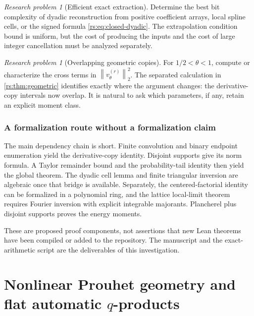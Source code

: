 \documentclass[11pt,a4paper,oneside,openany]{book}
\numberwithin{equation}{chapter}
\theoremstyle{definition}
\theoremstyle{remark}
\newtheorem{problem}[theorem]{Research problem}
\newcommand{\norm}[1]{\left\lVert #1\right\rVert}
\begin{document}
\begin{problem}[Efficient exact extraction]
Determine the best bit complexity of dyadic reconstruction from
positive coefficient arrays, local spline cells, or the signed
formula \eqref{rs:eq:closed-dyadic}. The extrapolation condition bound
is uniform, but the cost of producing the inputs and the cost of
large integer cancellation must be analyzed separately.
\end{problem}

\begin{problem}[Overlapping geometric copies]
For $1/2<\theta<1$, compute or characterize the cross terms in
$\norm{v_\theta^{(r)}}_2^2$. The separated calculation in
\cref{rs:thm:geometric} identifies exactly where the argument changes:
the derivative-copy intervals now overlap. It is natural to ask
which parameters, if any, retain an explicit moment class.
\end{problem}

\section{A formalization route without a formalization claim}

The main dependency chain is short. Finite convolution and binary
endpoint enumeration yield the derivative-copy identity. Disjoint
supports give its norm formula. A Taylor remainder bound and the
probability-tail identity then yield the global theorem. The
dyadic cell lemma and finite triangular inversion are algebraic
once that bridge is available. Separately, the centered-factorial
identity can be formalized in a polynomial ring, and the lattice
local-limit theorem requires Fourier inversion with explicit
integrable majorants. Plancherel plus disjoint supports proves
the energy moments.

These are proposed proof components, not assertions that new Lean
theorems have been compiled or added to the repository. The
manuscript and the exact-arithmetic script are the deliverables
of this investigation.

\part{Nonlinear Prouhet geometry and flat automatic \texorpdfstring{$q$}{q}-products}
\label{part:nonlinear}
\end{document}

